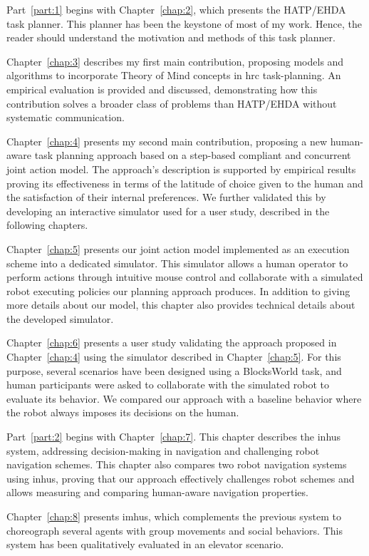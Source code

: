 Part~\ref{part:1} begins with Chapter~\ref{chap:2}, which presents the HATP/EHDA task planner. This planner has been the keystone of most of my work. Hence, the reader should understand the motivation and methods of this task planner.

Chapter~\ref{chap:3} describes my first main contribution, proposing models and algorithms to incorporate Theory of Mind concepts in \acrshort{hrc} task-planning. An empirical evaluation is provided and discussed, demonstrating how this contribution solves a broader class of problems than HATP/EHDA without systematic communication.

Chapter~\ref{chap:4} presents my second main contribution, proposing a new human-aware task planning approach based on a step-based compliant and concurrent joint action model. The approach's description is supported by empirical results proving its effectiveness in terms of the latitude of choice given to the human and the satisfaction of their internal preferences. We further validated this by developing an interactive simulator used for a user study, described in the following chapters.

Chapter~\ref{chap:5} presents our joint action model implemented as an execution scheme into a dedicated simulator. 
This simulator allows a human operator to perform actions through intuitive mouse control and collaborate with a simulated robot executing policies our planning approach produces. In addition to giving more details about our model, this chapter also provides technical details about the developed simulator. 

Chapter~\ref{chap:6} presents a user study validating the approach proposed in Chapter~\ref{chap:4} using the simulator described in Chapter~\ref{chap:5}. For this purpose, several scenarios have been designed using a BlocksWorld task, and human participants were asked to collaborate with the simulated robot to evaluate its behavior. We compared our approach with a baseline behavior where the robot always imposes its decisions on the human. 

Part~\ref{part:2} begins with Chapter~\ref{chap:7}.
This chapter describes the \acrshort{inhus} system, addressing decision-making in navigation and challenging robot navigation schemes. This chapter also compares two robot navigation systems using \acrshort{inhus}, proving that our approach effectively challenges robot schemes and allows measuring and comparing human-aware navigation properties.


Chapter~\ref{chap:8} presents \acrshort{imhus}, which complements the previous system to choreograph several agents with group movements and social behaviors. This system has been qualitatively evaluated in an elevator scenario.


